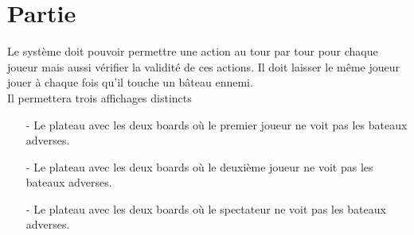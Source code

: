 \documentclass[../besoin_sys.tex]{subfiles}
\begin{document}
\section{Partie}
Le système doit pouvoir permettre une action au tour par tour pour chaque joueur mais aussi vérifier la validité de ces actions.
Il doit laisser le même joueur jouer à chaque fois qu'il touche un bâteau ennemi.\\
Il permettera trois affichages distincts
\begin{itemize}
	\item[-] Le plateau avec les deux boards où le premier joueur ne voit pas les bateaux adverses.
	\item[-] Le plateau avec les deux boards où le deuxième joueur ne voit pas les bateaux adverses.
	\item[-] Le plateau avec les deux boards où le spectateur ne voit pas les bateaux adverses.
  \end{itemize}
\end{document}
